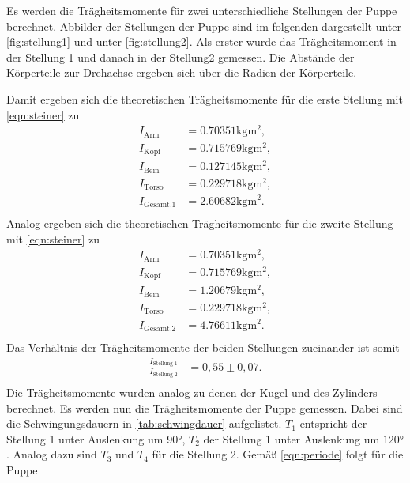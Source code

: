 Es werden die Trägheitsmomente für zwei unterschiedliche Stellungen der Puppe berechnet. Abbilder der Stellungen der Puppe sind im folgenden
dargestellt unter \autoref{fig:stellung1} und unter \autoref{fig:stellung2}. 
Als erster wurde das Trägheitsmoment in der Stellung 1 und danach in der Stellung2 gemessen.
Die Abstände der Körperteile zur Drehachse ergeben sich über die Radien der Körperteile.

Damit ergeben sich die theoretischen Trägheitsmomente für die erste Stellung  mit \autoref{eqn:steiner} zu
\begin{align*}
  I_{\text{Arm}} &= 0.70351 \si{\kilogram\meter^2}, \\
  I_{\text{Kopf}} &= 0.715769 \si{\kilogram\meter^2}, \\
  I_{\text{Bein}} &= 0.127145 \si{\kilogram\meter^2}, \\
  I_{\text{Torso}} &= 0.229718 \si{\kilogram\meter^2}, \\
  I_{\text{Gesamt,1}} &= 2.60682 \si{\kilogram\meter^2}. \\
\end{align*}
Analog ergeben sich die theoretischen Trägheitsmomente für die zweite Stellung mit \autoref{eqn:steiner} zu
\begin{align*}
  I_{\text{Arm}} &= 0.70351 \si{\kilogram\meter^2}, \\
  I_{\text{Kopf}} &= 0.715769 \si{\kilogram\meter^2}, \\
  I_{\text{Bein}} &= 1.20679 \si{\kilogram\meter^2}, \\ 
  I_{\text{Torso}} &= 0.229718 \si{\kilogram\meter^2}, \\
  I_{\text{Gesamt,2}} &= 4.76611 \si{\kilogram\meter^2}. \\
\end{align*}
Das Verhältnis der Trägheitsmomente der beiden Stellungen zueinander ist somit
\begin{align*}
  \frac{I_{\text{Stellung 1}}}{I_{\text{Stellung 2}}} &= 0,55\pm 0,07.  \\
\end{align*}
Die Trägheitsmomente wurden analog zu denen der Kugel und des Zylinders berechnet. 
Es werden nun die Trägheitsmomente der Puppe gemessen.
Dabei sind die Schwingungsdauern in \autoref{tab:schwingdauer} aufgelistet.
$T_1$ entspricht der Stellung 1 unter Auslenkung um $90°$, $T_2$ der Stellung 1 unter Auslenkung um $120°$.
Analog dazu sind $T_3$ und $T_4$ für die Stellung 2. Gemäß \autoref{eqn:periode} folgt für die Puppe

